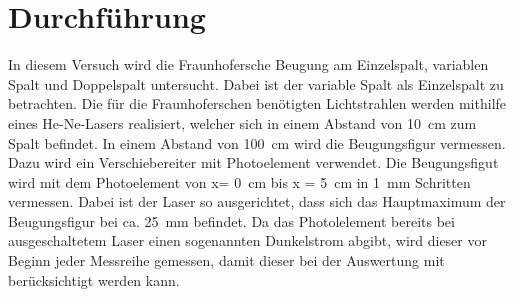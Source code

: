 
\section{Durchführung}
In diesem Versuch wird die Fraunhofersche Beugung am Einzelspalt, variablen Spalt und Doppelspalt untersucht. Dabei ist der variable Spalt als Einzelspalt zu betrachten.
Die für die Fraunhoferschen benötigten Lichtstrahlen werden mithilfe eines He-Ne-Lasers realisiert, welcher sich in einem Abstand von \SI{10}{\centi\metre} zum Spalt befindet. In einem Abstand von \SI{100}{\centi\metre} wird die Beugungsfigur vermessen. Dazu wird ein Verschiebereiter mit Photoelement verwendet. Die Beugungsfigut wird mit dem Photoelement von x= \SI{0}{\centi\metre} bis x =  \SI{5}{\centi\metre} in \SI{1}{\milli\metre} Schritten vermessen. Dabei ist der Laser so ausgerichtet, dass sich das Hauptmaximum der Beugungsfigur bei ca. \SI{25}{\milli\metre} befindet. Da das Photolelement bereits bei ausgeschaltetem Laser einen sogenannten Dunkelstrom abgibt, wird dieser vor Beginn jeder Messreihe gemessen, damit dieser bei der Auswertung mit berücksichtigt werden kann.